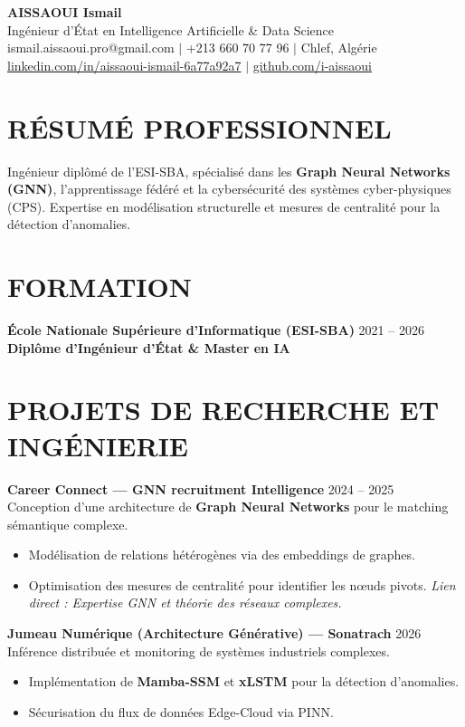 \documentclass[a4paper,11pt]{article}
\begin{document}
\begin{center}
    {\Huge\bfseries\color{titleblue} AISSAOUI Ismail}\\[4pt]
    {\Large Ingénieur d'État en Intelligence Artificielle \& Data Science}\\[6pt]
    ismail.aissaoui.pro@gmail.com $|$ +213 660 70 77 96 $|$ Chlef, Algérie \\
    \href{https://linkedin.com/in/aissaoui-ismail-6a77a92a7}{linkedin.com/in/aissaoui-ismail-6a77a92a7} $|$ \href{https://github.com/i-aissaoui}{github.com/i-aissaoui}
\end{center}

\section{RÉSUMÉ PROFESSIONNEL}
Ingénieur diplômé de l'ESI-SBA, spécialisé dans les \textbf{Graph Neural Networks (GNN)}, l'apprentissage fédéré et la cybersécurité des systèmes cyber-physiques (CPS). Expertise en modélisation structurelle et mesures de centralité pour la détection d'anomalies.

\section{FORMATION}
\textbf{École Nationale Supérieure d’Informatique (ESI-SBA)} \hfill 2021 -- 2026 \\
\textbf{Diplôme d'Ingénieur d'État \& Master en IA}

\section{PROJETS DE RECHERCHE ET INGÉNIERIE}

\textbf{Career Connect — GNN recruitment Intelligence} \hfill 2024 -- 2025 \\
Conception d'une architecture de \textbf{Graph Neural Networks} pour le matching sémantique complexe.
\begin{itemize}
    \item Modélisation de relations hétérogènes via des embeddings de graphes.
    \item Optimisation des mesures de centralité pour identifier les nœuds pivots.
    \textit{Lien direct : Expertise GNN et théorie des réseaux complexes.}
\end{itemize}

\textbf{Jumeau Numérique (Architecture Générative) — Sonatrach} \hfill 2026 \\
Inférence distribuée et monitoring de systèmes industriels complexes.
\begin{itemize}
    \item Implémentation de \textbf{Mamba-SSM} et \textbf{xLSTM} pour la détection d'anomalies.
    \item Sécurisation du flux de données Edge-Cloud via PINN.
\end{itemize}
\end{document}
